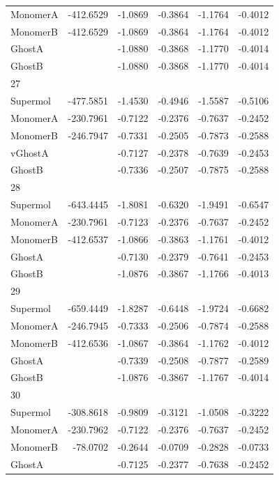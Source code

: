 \documentclass[journal=jctcce,manuscript=article]{achemso}
\begin{document}
\begin{spacing}{1}
\begin{longtable}{lRRRRR}
    MonomerA & -412.6529 & -1.0869 & -0.3864 & -1.1764 & -0.4012 \\
    MonomerB & -412.6529 & -1.0869 & -0.3864 & -1.1764 & -0.4012 \\
    GhostA &  & -1.0880 & -0.3868 & -1.1770 & -0.4014 \\
    GhostB &  & -1.0880 & -0.3868 & -1.1770 & -0.4014 \\
    27 &  &  &  &  &  \\
    Supermol & -477.5851 & -1.4530 & -0.4946 & -1.5587 & -0.5106 \\
    MonomerA & -230.7961 & -0.7122 & -0.2376 & -0.7637 & -0.2452 \\
    MonomerB & -246.7947 & -0.7331 & -0.2505 & -0.7873 & -0.2588 \\
    vGhostA &  & -0.7127 & -0.2378 & -0.7639 & -0.2453 \\
    GhostB &  & -0.7336 & -0.2507 & -0.7875 & -0.2588 \\
    28 &  &  &  &  &  \\
    Supermol & -643.4445 & -1.8081 & -0.6320 & -1.9491 & -0.6547 \\
    MonomerA & -230.7961 & -0.7123 & -0.2376 & -0.7637 & -0.2452 \\
    MonomerB & -412.6537 & -1.0866 & -0.3863 & -1.1761 & -0.4012 \\
    GhostA &  & -0.7130 & -0.2379 & -0.7641 & -0.2453 \\
    GhostB &  & -1.0876 & -0.3867 & -1.1766 & -0.4013 \\
    29 &  &  &  &  &  \\
    Supermol & -659.4449 & -1.8287 & -0.6448 & -1.9724 & -0.6682 \\
    MonomerA & -246.7945 & -0.7333 & -0.2506 & -0.7874 & -0.2588 \\
    MonomerB & -412.6536 & -1.0867 & -0.3864 & -1.1762 & -0.4012 \\
    GhostA &  & -0.7339 & -0.2508 & -0.7877 & -0.2589 \\
    GhostB &  & -1.0876 & -0.3867 & -1.1767 & -0.4014 \\
    30 &  &  &  &  &  \\
    Supermol & -308.8618 & -0.9809 & -0.3121 & -1.0508 & -0.3222 \\
    MonomerA & -230.7962 & -0.7122 & -0.2376 & -0.7637 & -0.2452 \\
    MonomerB & -78.0702 & -0.2644 & -0.0709 & -0.2828 & -0.0733 \\
    GhostA &  & -0.7125 & -0.2377 & -0.7638 & -0.2452 \\

\end{longtable}
\end{spacing}
\end{document}
